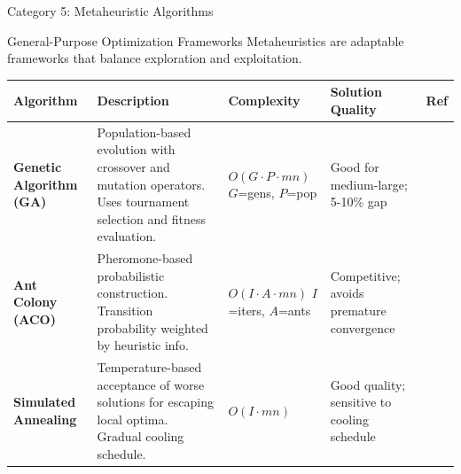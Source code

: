\documentclass[aspectratio=43,8pt]{beamer}
\begin{document}
\begin{frame}{Category 5: Metaheuristic Algorithms}
\begin{block}{General-Purpose Optimization Frameworks}
Metaheuristics are adaptable frameworks that balance exploration and exploitation.
\end{block}

\vspace{0.2cm}
\begin{table}[h]
\centering
\small
\begin{tabular}{p{1.6cm}p{3.5cm}p{1.6cm}p{1.7cm}p{0.9cm}}
\toprule
\textbf{Algorithm} & \textbf{Description} & \textbf{Complexity} & \textbf{Solution Quality} & \textbf{Ref} \\
\midrule
\textbf{Genetic Algorithm (GA)} & Population-based evolution with crossover and mutation operators. Uses tournament selection and fitness evaluation. & $O(G \cdot P \cdot mn)$ $G$=gens, $P$=pop & Good for medium-large; 5-10\% gap & \cite{lee2003} \\
\addlinespace
\textbf{Ant Colony (ACO)} & Pheromone-based probabilistic construction. Transition probability weighted by heuristic info. & $O(I \cdot A \cdot mn)$ $I$=iters, $A$=ants & Competitive; avoids premature convergence & \cite{lee2002} \\
\addlinespace
\textbf{Simulated Annealing} & Temperature-based acceptance of worse solutions for escaping local optima. Gradual cooling schedule. & $O(I \cdot mn)$ & Good quality; sensitive to cooling schedule & \cite{kline2020} \\
\bottomrule
\end{tabular}
\end{table}
\end{frame}
\end{document}
